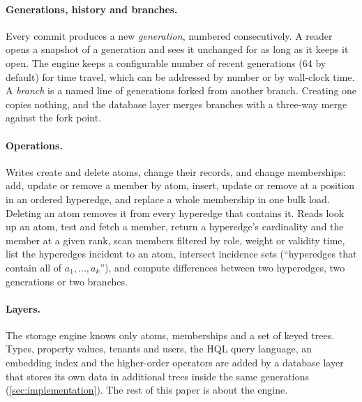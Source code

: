 \paragraph{Generations, history and branches.} Every commit produces a new \emph{generation}, numbered consecutively. A reader opens a snapshot of a generation and sees it unchanged for as long as it keeps it open. The engine keeps a configurable number of recent generations (64 by default) for time travel, which can be addressed by number or by wall-clock time. A \emph{branch} is a named line of generations forked from another branch. Creating one copies nothing, and the database layer merges branches with a three-way merge against the fork point.

\paragraph{Operations.} Writes create and delete atoms, change their records, and change memberships: add, update or remove a member by atom, insert, update or remove at a position in an ordered hyperedge, and replace a whole membership in one bulk load. Deleting an atom removes it from every hyperedge that contains it. Reads look up an atom, test and fetch a member, return a hyperedge's cardinality and the member at a given rank, scan members filtered by role, weight or validity time, list the hyperedges incident to an atom, intersect incidence sets (``hyperedges that contain all of $a_1,\dots,a_k$''), and compute differences between two hyperedges, two generations or two branches.

\paragraph{Layers.} The storage engine knows only atoms, memberships and a set of keyed trees. Types, property values, tenants and users, the HQL query language, an embedding index and the higher-order operators are added by a database layer that stores its own data in additional trees inside the same generations (\cref{sec:implementation}). The rest of this paper is about the engine.
